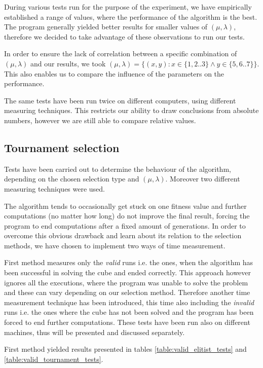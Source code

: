 \documentclass[a4paper]{article}
\begin{document}
During various tests run for the purpose of the experiment, we have empirically established a range of values, where the performance of the algorithm is the best. The program generally yielded better results for smaller values of $(\mu, \lambda)$, therefore we decided to take advantage of these observations to run our tests.

In order to ensure the lack of correlation between a specific combination of $(\mu, \lambda)$ and our results, we took  $(\mu, \lambda) = \{(x,y) : x \in \{1,2..3\} \wedge y \in \{5,6..7\}\}$. This also enables us to compare the influence of the parameters on the performance.

The same tests have been run twice on different computers, using different measuring techniques. This restricts our ability to draw conclusions from absolute numbers, however we are still able to compare relative values.

\subsection{Tournament selection}

Tests have been carried out to determine the behaviour of the algorithm, depending on the chosen selection type and $(\mu, \lambda)$. Moreover two different measuring techniques were used.

The algorithm tends to occasionally get stuck on one fitness value and further computations (no matter how long) do not improve the final result, forcing the program to end computations after a fixed amount of generations. In order to overcome this obvious drawback and learn about its relation to the selection methods, we have chosen to implement two ways of time measurement.

First method measures only the \textit{valid} runs i.e. the ones, when the algorithm has been successful in solving the cube and ended correctly. This approach however ignores all the executions, where the program was unable to solve the problem and these can vary depending on our selection method. Therefore another time measurement technique has been introduced, this time also including the \textit{invalid} runs i.e. the ones where the cube has not been solved and the program has been forced to end further computations. These tests have been run also on different machines, thus will be presented and discussed separately.

First method yielded results presented in tables \ref{table:valid_elitist_tests} and \ref{table:valid_tournament_tests}.
\end{document}
